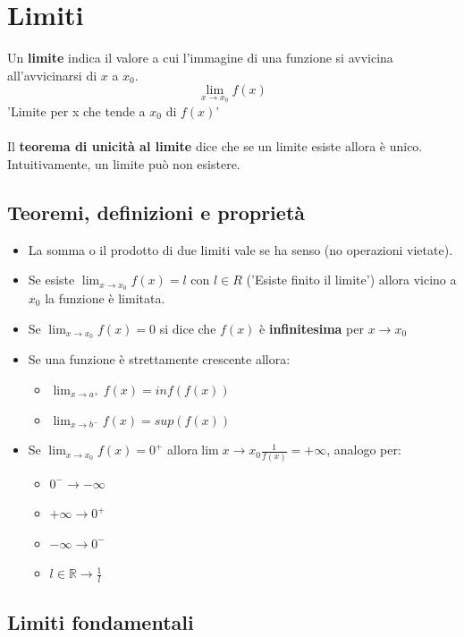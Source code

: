 \documentclass[12pt,a4paper]{article}
\let\oldsection\section
\renewcommand{\section}{\clearpage\oldsection}
\begin{document}
\section{Limiti}
Un \textbf{limite} indica il valore a cui l'immagine di una funzione si avvicina all'avvicinarsi di $x$ a $x_0$.
\[
\lim_{x \to x_0} f(x)  
\]
'Limite per x che tende a $x_0$ di $f(x)$'\\\\
Il \textbf{teorema di unicità al limite} dice che se un limite esiste allora è unico.\\
Intuitivamente, un limite può non esistere.

\subsection{Teoremi, definizioni e proprietà}
\begin{itemize}
  \item La somma o il prodotto di due limiti vale se ha senso (no operazioni vietate).
  \item Se esiste $\lim_{x \to x_0} f(x) = l$ con $l \in R$ ('Esiste finito il limite') allora vicino a $x_0$ la funzione è limitata. 
  \item Se $\lim_{x \to x_0} f(x) = 0$ si dice che $f(x)$ è \textbf{infinitesima} per $x \rightarrow x_0$
  \item Se una funzione è strettamente crescente allora:
  \begin{itemize}
    \item $\lim_{x \to a^+} f(x) = inf(f(x))$
    \item $\lim_{x \to b^-} f(x) = sup(f(x))$
  \end{itemize}
  \item Se $\lim_{x \to x_0} f(x) = 0^+$ allora$\lim{x \to x_0} \frac{1}{f(x)} = +\infty$, analogo per:
  \begin{itemize}
    \item $0^- \rightarrow -\infty$
    \item $+\infty \rightarrow 0^+$
    \item $-\infty \rightarrow 0^-$
    \item $l \in \mathbb{R} \rightarrow \frac{1}{l}$
  \end{itemize}
\end{itemize}

\subsection{Limiti fondamentali}
\end{document}
